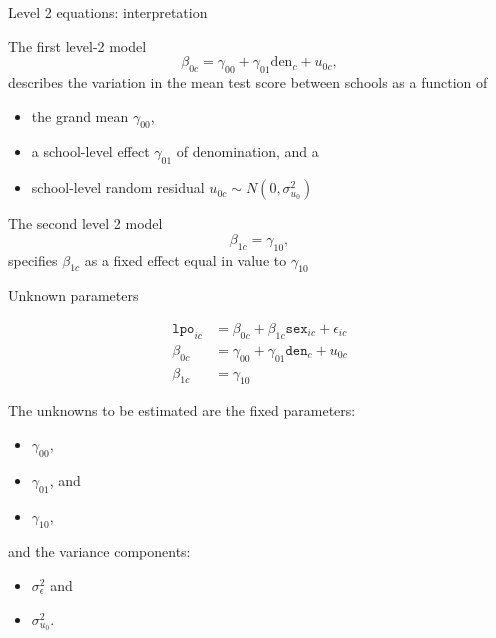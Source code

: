 \documentclass[ignorenonframetext,aspectratio=43]{beamer}
\providecommand{\tightlist}{%
  \setlength{\itemsep}{0pt}\setlength{\parskip}{0pt}}
\begin{document}
\begin{frame}{Level 2 equations: interpretation}
\protect\hypertarget{level-2-equations-interpretation}{}

The first level-2 model
\[\beta_{0c} = \gamma_{00} + \gamma_{01}\text{den}_c + u_{0c}, \]
describes the variation in the mean test score between schools as a
function of

\begin{itemize}
\tightlist
\item
  the grand mean \(\gamma_{00}\),
\item
  a school-level effect \(\gamma_{01}\) of denomination, and a
\item
  school-level random residual \(u_{0c}\sim N(0, \sigma_{u_0}^2)\)
\end{itemize}

The second level 2 model \[\beta_{1c} = \gamma_{10},\] specifies
\(\beta_{1c}\) as a fixed effect equal in value to \(\gamma_{10}\)

\end{frame}

\begin{frame}{Unknown parameters}
\protect\hypertarget{unknown-parameters}{}

\begin{align}
{{\texttt{lpo}}}_{ic} & = \beta_{0c} + \beta_{1c}{{\texttt{sex}}}_{ic} + \epsilon_{ic}\\
\beta_{0c}     & = \gamma_{00} + \gamma_{01}{{\texttt{den}}}_{c} + u_{0c}\\
\beta_{1c}     & = \gamma_{10}
\end{align}

The unknowns to be estimated are the fixed parameters:

\begin{itemize}
\tightlist
\item
  \(\gamma_{00}\),
\item
  \(\gamma_{01}\), and
\item
  \(\gamma_{10},\)
\end{itemize}

and the variance components:

\begin{itemize}
\tightlist
\item
  \(\sigma_\epsilon^2\) and
\item
  \(\sigma_{u_0}^2.\)
\end{itemize}

\end{frame}
\end{document}
